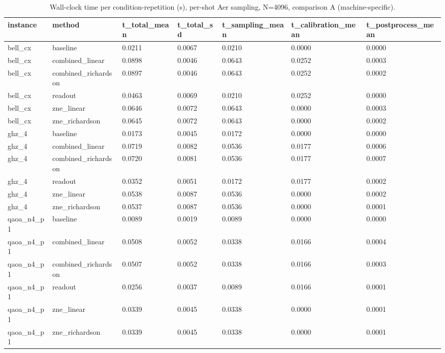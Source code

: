 \begin{table}[t]
\centering
\small
\caption{Wall-clock time per condition-repetition (s), per-shot Aer sampling, N=4096, comparison A (machine-specific).}
\label{tab:timing}
\begin{tabular}{lllllll}
\toprule
instance & method & t\_total\_mean & t\_total\_sd & t\_sampling\_mean & t\_calibration\_mean & t\_postprocess\_mean \\
\midrule
bell\_cx & baseline & 0.0211 & 0.0067 & 0.0210 & 0.0000 & 0.0000 \\
bell\_cx & combined\_linear & 0.0898 & 0.0046 & 0.0643 & 0.0252 & 0.0003 \\
bell\_cx & combined\_richardson & 0.0897 & 0.0046 & 0.0643 & 0.0252 & 0.0002 \\
bell\_cx & readout & 0.0463 & 0.0069 & 0.0210 & 0.0252 & 0.0000 \\
bell\_cx & zne\_linear & 0.0646 & 0.0072 & 0.0643 & 0.0000 & 0.0003 \\
bell\_cx & zne\_richardson & 0.0645 & 0.0072 & 0.0643 & 0.0000 & 0.0002 \\
ghz\_4 & baseline & 0.0173 & 0.0045 & 0.0172 & 0.0000 & 0.0000 \\
ghz\_4 & combined\_linear & 0.0719 & 0.0082 & 0.0536 & 0.0177 & 0.0006 \\
ghz\_4 & combined\_richardson & 0.0720 & 0.0081 & 0.0536 & 0.0177 & 0.0007 \\
ghz\_4 & readout & 0.0352 & 0.0051 & 0.0172 & 0.0177 & 0.0002 \\
ghz\_4 & zne\_linear & 0.0538 & 0.0087 & 0.0536 & 0.0000 & 0.0002 \\
ghz\_4 & zne\_richardson & 0.0537 & 0.0087 & 0.0536 & 0.0000 & 0.0001 \\
qaoa\_n4\_p1 & baseline & 0.0089 & 0.0019 & 0.0089 & 0.0000 & 0.0000 \\
qaoa\_n4\_p1 & combined\_linear & 0.0508 & 0.0052 & 0.0338 & 0.0166 & 0.0004 \\
qaoa\_n4\_p1 & combined\_richardson & 0.0507 & 0.0052 & 0.0338 & 0.0166 & 0.0003 \\
qaoa\_n4\_p1 & readout & 0.0256 & 0.0037 & 0.0089 & 0.0166 & 0.0001 \\
qaoa\_n4\_p1 & zne\_linear & 0.0339 & 0.0045 & 0.0338 & 0.0000 & 0.0001 \\
qaoa\_n4\_p1 & zne\_richardson & 0.0339 & 0.0045 & 0.0338 & 0.0000 & 0.0001 \\
\bottomrule
\end{tabular}
\end{table}
